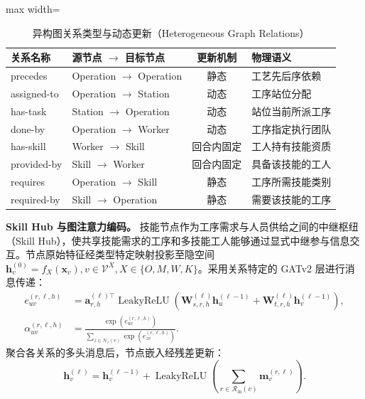 \documentclass[journal,10pt]{IEEEtran}
\renewcommand{\arraystretch}{1.04}
\begin{document}
\begin{table}[!t]
\centering
\caption{异构图关系类型与动态更新（Heterogeneous Graph Relations）}
\label{tab:relations}
\setlength{\tabcolsep}{3pt}
\renewcommand{\arraystretch}{1.0}
\begin{adjustbox}{max width=\columnwidth}
\begin{tabular}{@{}llcl@{}}
\toprule
\textbf{关系名称} & \textbf{源节点 $\to$ 目标节点} & \textbf{更新机制} & \textbf{物理语义} \\
\midrule
precedes & Operation $\to$ Operation & 静态 & 工艺先后序依赖 \\
assigned-to & Operation $\to$ Station & 动态 & 工序站位分配 \\
has-task & Station $\to$ Operation & 动态 & 站位当前所派工序 \\
done-by & Operation $\to$ Worker & 动态 & 工序指定执行团队 \\
has-skill & Worker $\to$ Skill & 回合内固定 & 工人持有技能资质 \\
provided-by & Skill $\to$ Worker & 回合内固定 & 具备该技能的工人 \\
requires & Operation $\to$ Skill & 静态 & 工序所需技能类别 \\
required-by & Skill $\to$ Operation & 静态 & 需要该技能的工序 \\
\bottomrule
\end{tabular}
\end{adjustbox}
\end{table}

\textbf{Skill Hub 与图注意力编码。} 技能节点作为工序需求与人员供给之间的中继枢纽（Skill Hub），使共享技能需求的工序和多技能工人能够通过显式中继参与信息交互。节点原始特征经类型特定映射投影至隐空间 $\mathbf h_v^{(0)}=f_X(\mathbf x_v), v\in\mathcal{V}^X, X\in\{O,M,W,K\}$。采用关系特定的 GATv2 层\cite{brody2022}进行消息传递：
\begin{align}
e_{uv}^{(r,\ell,h)} &= \mathbf a_{r,h}^{(\ell)\top}\operatorname{LeakyReLU}\left(\mathbf W_{s,r,h}^{(\ell)}\mathbf h_u^{(\ell-1)} + \mathbf W_{t,r,h}^{(\ell)}\mathbf h_v^{(\ell-1)}\right), \\
\alpha_{uv}^{(r,\ell,h)} &= \frac{\exp(e_{uv}^{(r,\ell,h)})}{\sum_{z\in\mathcal N_r(v)}\exp(e_{zv}^{(r,\ell,h)})}.
\end{align}
聚合各关系的多头消息后，节点嵌入经残差更新：
\begin{equation}
\mathbf h_v^{(\ell)} = \mathbf h_v^{(\ell-1)} + \operatorname{LeakyReLU}\left(\sum_{r\in\mathcal R_{\mathrm{in}}(v)}\mathbf m_v^{(r,\ell)}\right).
\end{equation}
\end{document}
